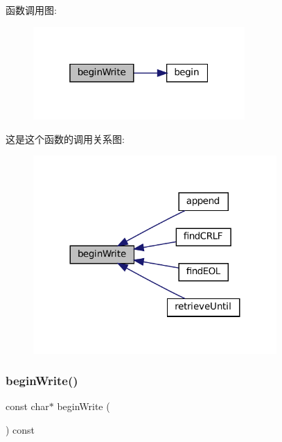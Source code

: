 函数调用图\+:
\nopagebreak
\begin{figure}[H]
\begin{center}
\leavevmode
\includegraphics[width=229pt]{classmuduo_1_1net_1_1Buffer_a71778facb9cd13bc2403edf59621f3f5_cgraph}
\end{center}
\end{figure}
这是这个函数的调用关系图\+:
\nopagebreak
\begin{figure}[H]
\begin{center}
\leavevmode
\includegraphics[width=263pt]{classmuduo_1_1net_1_1Buffer_a71778facb9cd13bc2403edf59621f3f5_icgraph}
\end{center}
\end{figure}
\mbox{\label{classmuduo_1_1net_1_1Buffer_a46f79eca290d4d4cee634e3c1b50c57d}} 
\subsubsection{\texorpdfstring{begin\+Write()}{beginWrite()}\hspace{0.1cm}{\footnotesize\ttfamily [2/2]}}
{\footnotesize\ttfamily const char$\ast$ begin\+Write (\begin{DoxyParamCaption}{ }\end{DoxyParamCaption}) const\hspace{0.3cm}{\ttfamily [inline]}}



